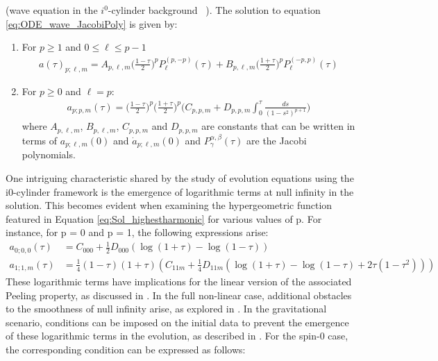 \begin{lemma} (wave equation in the $i^0$-cylinder
  background~ \cite{MinMacKro22})\label{Lemma:Sol_Jacobi_and_Logs}. The solution to equation \eqref{eq:ODE_wave_JacobiPoly} is given
  by:
	\begin{enumerate}
	\item For $p\geq 1$ and $0\leq \ell \leq p-1$
	 \begin{align}\label{eq:Sol_jac_poly}
    a(\tau)_{p;\ell,m} =A_{p,\ell,m}
		  \bigg(\frac{1-\tau}{2}\bigg)^{p}
                  P_{\ell}^{(p,-p)}(\tau) + B_{p,\ell,m}
                  \bigg(\frac{1+\tau}{2}\bigg)^{p}P_{\ell}^{(-p,p)}(\tau)
	 \end{align}
	
	\item For $p\geq 0$ and $\ell=p$:
     \begin{align}\label{eq:Sol_highestharmonic}
      {a}_{p;p,m}(\tau) =
      \bigg(\frac{1-\tau}{2}\bigg)^{p}\bigg(\frac{1+\tau}{2}\bigg)^{p}\Bigg(C_{p,p,m}
      +D_{p,p,m}\int_{0}^{\tau} \frac{ds}{(1-s^2)^{p+1}}\Bigg)
     \end{align}
	where $A_{p,\ell,m}$, $B_{p,\ell,m}$, $C_{p,p,m}$ and
        $D_{p,p,m}$ are constants that can be written in terms of
        $a_{p;\ell,m}(0)$ and $\dot{a}_{p;\ell,m}(0)$ and
        $P_{\gamma}^{\alpha, \beta}(\tau)$ are the Jacobi polynomials.
    \end{enumerate}
\end{lemma}

\pagebreak

One intriguing characteristic shared by the study of evolution equations using the i0-cylinder framework is the emergence of logarithmic terms at null infinity in the solution. This becomes evident when examining the hypergeometric function featured in Equation \eqref{eq:Sol_highestharmonic} for various values of p. For instance, for p = 0 and p = 1, the following expressions arise:
\begin{align}
  {a}_{0;0,0}(\tau) & = C_{000} + \tfrac{1}{2} D_{000} (\log(1 + \tau
  )- \log(1 - \tau ))\\ {a}_{1;1,m}(\tau) & = \tfrac{1}{4} (1 - \tau )
  (1 + \tau ) (C_{11m} + \tfrac{1}{4} D_{11m} ( \log(1 + \tau ) -
  \log(1 - \tau ) + 2\tau(1-\tau^2)))
\end{align}
These logarithmic terms have implications for the linear version of the associated Peeling property, as discussed in \cite{Val07,MinMacKro22}. In the full non-linear case, additional obstacles to the smoothness of null infinity arise, as explored in \cite{Val04}. In the gravitational scenario, conditions can be imposed on the initial data to prevent the emergence of these logarithmic terms in the evolution, as described in \cite{Fri98a}. For the spin-0 case, the corresponding condition can be expressed as follows:

